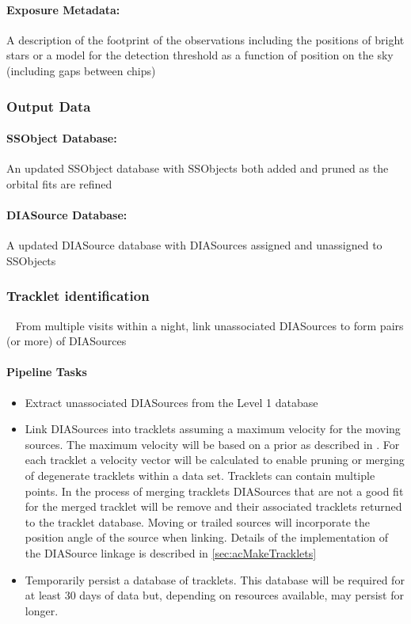 \paragraph*{Exposure Metadata:} A description of the footprint of the observations including the positions of bright stars or a model for the detection threshold as a function of position on the sky (including gaps between chips)


\subsubsection{Output Data}

\paragraph*{SSObject Database: } An updated SSObject database with SSObjects both added and pruned as the orbital fits are refined

\paragraph*{DIASource Database:} A updated DIASource database with DIASources assigned and unassigned to SSObjects


\subsubsection{Tracklet identification}~
From multiple visits within a night, link unassociated DIASources to form pairs (or more) of DIASources

\paragraph{Pipeline Tasks}

\begin{itemize}
\item Extract unassociated DIASources from the Level 1 database
\item Link DIASources into tracklets assuming a maximum velocity for the moving sources. The maximum velocity will be based on a prior as described in  \cite{kubica05}. For each tracklet a velocity vector will be calculated to enable pruning or merging of degenerate tracklets within a data set. Tracklets can contain multiple points. In the process of merging tracklets DIASources that are not a good fit for the merged tracklet will be remove and their associated tracklets returned to the tracklet database.  Moving or trailed sources will incorporate the position angle of the source when linking. Details of the implementation of the DIASource linkage is described in \ref{sec:acMakeTracklets}
\item Temporarily persist a database of tracklets. This database will be required for at least 30 days of data but, depending on resources available, may persist for longer.
\end{itemize}


